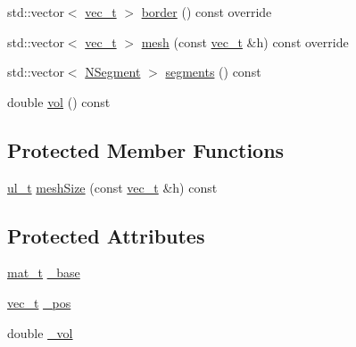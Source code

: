 \begin{DoxyCompactItemize}
\item 
std\+::vector$<$ \mbox{\hyperlink{group___n_algebra_ga0a2cfc67e738a3d73e4f12098c4c07f6}{vec\+\_\+t}} $>$ \mbox{\hyperlink{class_n_parallelepiped_a6cc531927e40a95b48923b56406206d3}{border}} () const override
\item 
std\+::vector$<$ \mbox{\hyperlink{group___n_algebra_ga0a2cfc67e738a3d73e4f12098c4c07f6}{vec\+\_\+t}} $>$ \mbox{\hyperlink{class_n_parallelepiped_a0f9ba9f6cab5d2c9472776e69f9aa78d}{mesh}} (const \mbox{\hyperlink{group___n_algebra_ga0a2cfc67e738a3d73e4f12098c4c07f6}{vec\+\_\+t}} \&h) const override
\item 
std\+::vector$<$ \mbox{\hyperlink{class_n_segment}{N\+Segment}} $>$ \mbox{\hyperlink{class_n_parallelepiped_a3440b48cfd7491ed747690a9f69dbbe4}{segments}} () const
\item 
double \mbox{\hyperlink{class_n_parallelepiped_a8529874bae044bdee3e0d805dae1887d}{vol}} () const
\end{DoxyCompactItemize}
\subsection*{Protected Member Functions}
\begin{DoxyCompactItemize}
\item 
\mbox{\hyperlink{typedef_8h_a1b140a2034db3f5dfe18a987745df43a}{ul\+\_\+t}} \mbox{\hyperlink{class_n_parallelepiped_a99696422faefb6e2f558c794017c95e4}{mesh\+Size}} (const \mbox{\hyperlink{group___n_algebra_ga0a2cfc67e738a3d73e4f12098c4c07f6}{vec\+\_\+t}} \&h) const
\end{DoxyCompactItemize}
\subsection*{Protected Attributes}
\begin{DoxyCompactItemize}
\item 
\mbox{\hyperlink{group___n_algebra_ga44dfb60c1e03b44e98a332fb2ae71947}{mat\+\_\+t}} \mbox{\hyperlink{class_n_parallelepiped_a02542ae7d5e1d052412eb06a292e0e9d}{\+\_\+base}}
\item 
\mbox{\hyperlink{group___n_algebra_ga0a2cfc67e738a3d73e4f12098c4c07f6}{vec\+\_\+t}} \mbox{\hyperlink{class_n_parallelepiped_ae1cc22beb853095d8a110c641dd8e005}{\+\_\+pos}}
\item 
double \mbox{\hyperlink{class_n_parallelepiped_aabd33c4ffeff864ea342440c08d4702b}{\+\_\+vol}}
\end{DoxyCompactItemize}


